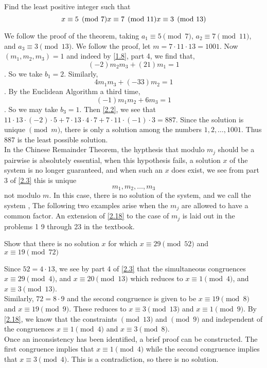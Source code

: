 \documentclass[11pt]{article}
\begin{document}
\begin{example}
    Find the least positive integer such that
    \[x \equiv 5 \pmod{7} \\ x \equiv 7 \pmod{11} \\ x \equiv 3 \pmod{13}\]
\end{example}
\begin{solution}
    We follow the proof of the theorem, taking \(a_1 \equiv 5 \pmod{7}\), \(a_2 \equiv 7 \pmod{11}\), and \(a_3 \equiv 3 \pmod{13}\). We follow the proof, let \(m = 7 \cdot 11 \cdot 13 = 1001\). Now \((m_1, m_2, m_3) = 1\) and indeed by \cref{1.8}, part 4, we find that, \[(-2) m_2 m_3 + (21)m_1 = 1\]. So we take \(b_1 = 2\). Similarly, \[4m_1 m_3 + (-33)m_2 = 1\]. By the Euclidean Algorithm a third time, \[(-1)m_1 m_2 + 6m_3 = 1\]. So we may take \(b_3 =1\). Then \cref{2.2}, we see that \(11 \cdot 13 \cdot (-2) \cdot 5 + 7 \cdot 13 \cdot 4 \cdot 7 + 7 \cdot 11 \cdot (-1) \cdot 3 = 887\). Since the solution is unique \(\pmod {m}\), there is only a solution among the numbers \(1, 2, \ldots, 1001\). Thus 887 is the least possible solution. \\ In the Chinese Remainder Theorem, the hypthesis that modulo \(m_j\) should be a pairwise is absolutely essential, when this hypothesis fails, a solution \(x\) of the system is no longer guaranteed, and when such an \(x\) does exist, we see from part 3 of \cref{2.3} this is unique \[m_1, m_2, \ldots, m_3\] not modulo \(m\). In this case, there is no solution of the system, and we call
    the system , The following two examples arise when the
    \(m_j\) are allowed to have a common factor. An extension of \cref{2.18} to the
    case of \(m_j\) is laid out in the problems 1 9 through 23 in the textbook.
\end{solution}

\begin{example}
    Show that there is no solution \(x\) for which \(x \equiv 29 \pmod{52}\) and \(x\equiv 19 \pmod{72}\)
\end{example}
\begin{solution}
    Since \(52 = 4 \cdot 13\), we see by part 4 of \cref{2.3} that the simultaneous congruences \(x \equiv 29 \pmod{4}\), and \(x \equiv 20 \pmod{13}\) which reduces to \(x \equiv 1 \pmod{4}\), and \(x \equiv 3 \pmod{13}\). \\ Similarly, \(72 = 8 \cdot 9\) and the second congruence is given to be \(x \equiv 19 \pmod{8}\) and \(x \equiv 19 \pmod{9}\). These reduces to \(x \equiv 3 \pmod{13}\) and \(x \equiv 1 \pmod{9}\). By \cref{2.18}, we know that the constraints \(\pmod{13}\) and \(\pmod{9}\) and independent of the congruences \(x \equiv 1 \pmod{4}\) and \(x \equiv 3 \pmod{8}\). \\ Once an inconsistency has been identified, a brief proof can be constructed. The first congruence implies that \(x \equiv 1 \pmod{4}\) while the second congruence implies that \(x \equiv 3 \pmod{4}\). This is a contradiction, so there is no solution.
\end{solution}
\end{document}

